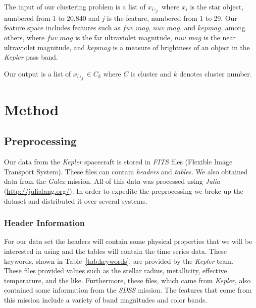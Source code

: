 \documentclass[12pt]{article}
\begin{document}

The input of our clustering problem is a list of $x_i,_j$ where $x_i$ is the star object, numbered from 1 to 20,840 and $j$ is the feature, numbered from 1 to 29.
Our feature space includes features such as $fuv\_mag$, $nuv\_mag$, and $kepmag$, among others, where $fuv\_mag$ is the far ultraviolet magnitude, $nuv\_mag$ is the near ultraviolet magnitude, and $kepmag$ is a measure of brightness of an object in the \textit{Kepler} pass band.

Our output is a list of $x_i,_j \in C_k$ where $C$ is cluster and $k$ denotes cluster number. 



\section{Method} %
\label{sec:Method}
\subsection{Preprocessing}
\label{sub:Preprocessing}
Our data from the \textit{Kepler} spacecraft is stored in \textit{FITS} files (Flexible Image Transport System).
These files can contain \emph{headers} and \emph{tables}.
We also obtained data from the \textit{Galex} mission.
All of this data was processed using \emph{Julia} (\url{http://julialang.org/}).
In order to expedite the preprocessing we broke up the dataset and distributed it over several systems.

\subsubsection{Header Information}
\label{ssub:Header Information}
For our data set the headers will contain some physical properties that we will be interested in using and the tables will contain the time series data.
These keywords, shown in Table~\ref{tab:keywords}, are provided by the \textit{Kepler} team.
These files provided values such as the stellar radius, metallicity, effective temperature, and the like.
Furthermore, these files, which came from \textit{Kepler}, also contained some information from the \textit{SDSS} mission.
The features that come from this mission include a variety of band magnitudes and color bands.
\end{document}

